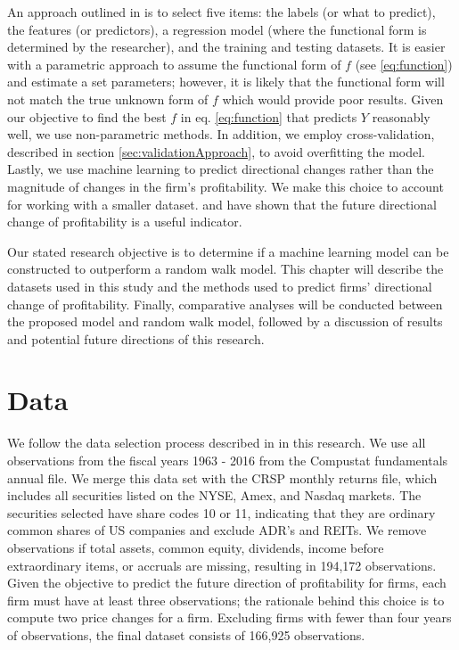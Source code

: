 An approach outlined in \cite{Monahan} is to select five items: the labels (or what to predict), the features (or predictors), a regression model (where the functional form is determined by the researcher),  and the training and testing datasets.  It is easier with a parametric approach to assume the functional form of \(f\) (see \ref{eq:function}) and estimate a set parameters; however,  it is likely that the functional form will not match the true unknown form of \(f\) which would provide poor results.  Given our objective to find the best \(f\) in eq. \ref{eq:function} that predicts \(Y\) reasonably well, we use non-parametric methods.  In addition, we employ cross-validation, described in section \ref{sec:validationApproach}, to avoid overfitting the model.  Lastly, we use machine learning to predict directional changes rather than the magnitude of changes in the firm's profitability. We make this choice to account for working with a smaller dataset.  \cite{BB68} and \cite{OU1989295} have shown that the future directional change of profitability is a useful indicator. 

Our stated research objective is to determine if a machine learning model can be constructed to outperform a random walk model.  This chapter will describe the datasets used in this study and the methods used to predict firms' directional change of profitability.  Finally, comparative analyses will be conducted between the proposed model and random walk model, followed by a discussion of results and potential future directions of this research.

\section{Data} \label{sec:ABIS:Data}

We follow the data selection process described in \cite{HOU2012504} in this research. We use all observations from the fiscal years 1963 - 2016 from the Compustat fundamentals annual file. We merge this data set with the CRSP monthly returns file, which includes all securities listed on the NYSE,  Amex,  and Nasdaq markets. The securities selected have share codes 10 or 11, indicating that they are ordinary common shares of US companies and exclude ADR's and REITs. We remove observations if total assets, common equity, dividends, income before extraordinary items,  or accruals are missing, resulting in 194,172 observations.  Given the objective to predict the future direction of profitability for firms, each firm must have at least three observations; the rationale behind this choice is to compute two price changes for a firm. Excluding firms with fewer than four years of observations, the final dataset consists of 166,925 observations. 

